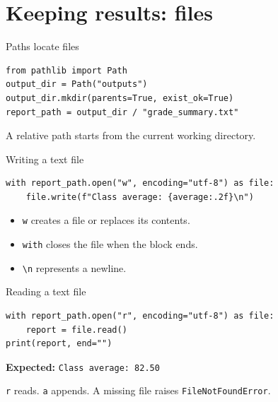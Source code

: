 \documentclass[aspectratio=169,12pt]{beamer}
\begin{document}
\section{Keeping results: files}
\begin{frame}[fragile]{Paths locate files}
\begin{lstlisting}
from pathlib import Path
output_dir = Path("outputs")
output_dir.mkdir(parents=True, exist_ok=True)
report_path = output_dir / "grade_summary.txt"
\end{lstlisting}
\par A relative path starts from the current working directory.
\end{frame}
\begin{frame}[fragile]{Writing a text file}
\begin{lstlisting}
with report_path.open("w", encoding="utf-8") as file:
    file.write(f"Class average: {average:.2f}\n")
\end{lstlisting}
\begin{itemize}
\item \texttt{w} creates a file or replaces its contents.
\item \texttt{with} closes the file when the block ends.
\item \texttt{\textbackslash n} represents a newline.
\end{itemize}

\end{frame}
\begin{frame}[fragile]{Reading a text file}
\begin{lstlisting}
with report_path.open("r", encoding="utf-8") as file:
    report = file.read()
print(report, end="")
\end{lstlisting}
\textbf{Expected:} \texttt{Class average: 82.50}
\par \texttt{r} reads. \texttt{a} appends. A missing file raises \texttt{FileNotFoundError}.
\end{frame}
\end{document}
